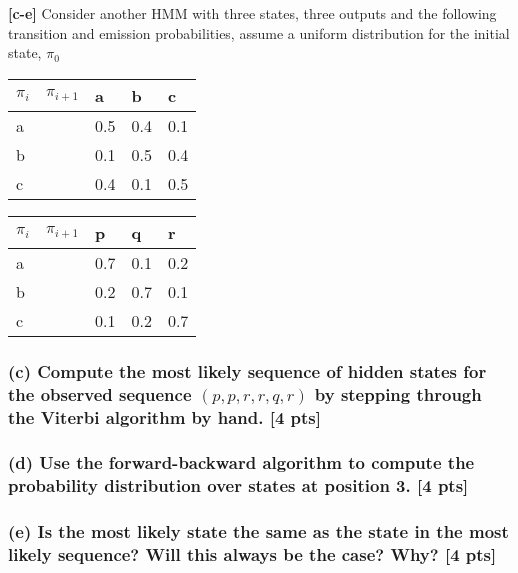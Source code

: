 \documentclass[twoside,11pt]{article}\usepackage{amsmath,amsfonts,amsthm,fullpage}
\begin{document}
\iffalse
\textbf{[c-e]} Consider another HMM with three states,  three
outputs and the following transition and emission probabilities,
assume a uniform distribution for the initial state, $\pi_0$


\begin{table}[!htb]

    \begin{minipage}{.5\linewidth}

      \centering

    \begin{tabular}{ll|l|l|l}
    $\pi_i$ & $\pi_{i+1}$ & a   & b   & c   \\ \hline
    a       & ~           & 0.5 & 0.4 & 0.1 \\ \hline
    b       & ~           & 0.1 & 0.5 & 0.4 \\ \hline
    c       & ~           & 0.4 & 0.1 & 0.5 \\
    \end{tabular}

    \end{minipage}%
    \begin{minipage}{.5\linewidth}
      \centering
   \begin{tabular}{ll|l|l|l}
    $\pi_i$ & $\pi_{i+1}$ & p   & q   & r   \\ \hline
    a       & ~           & 0.7 & 0.1 & 0.2 \\ \hline
    b       & ~           & 0.2 & 0.7 & 0.1 \\ \hline
    c       & ~           & 0.1 & 0.2 & 0.7 \\
    \end{tabular}
    \end{minipage}
\end{table}

\subsubsection*{(c) Compute the most likely sequence of hidden states for the observed sequence $(p, p, r, r, q,
r)$ by stepping through the Viterbi algorithm by hand. [4 pts]}

\subsubsection*{(d) Use the forward-backward algorithm to compute the probability distribution over states
at position 3. [4 pts]}

\subsubsection*{(e) Is the most likely state the same as the state in the most likely sequence? Will this
always be the case? Why? [4 pts]}
\end{document}
